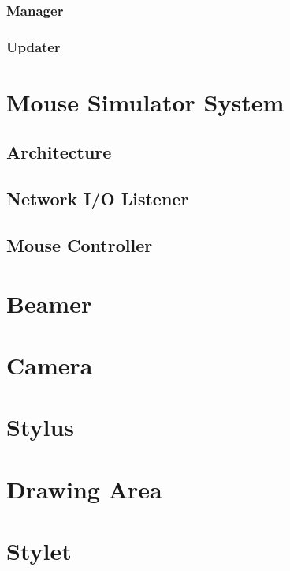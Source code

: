\documentclass[11pt,a4paper,oldfontcommands]{memoir}
\begin{document}
\subsubsection{Manager}

\subsubsection{Updater}

\newpage

\section{Mouse Simulator System}

\subsection{Architecture}

\subsection{Network I/O Listener}

\subsection{Mouse Controller}

\newpage

\section{Beamer}

\section{Camera}

\section{Stylus}

\section{Drawing Area}

\section{Stylet}
\end{document}
